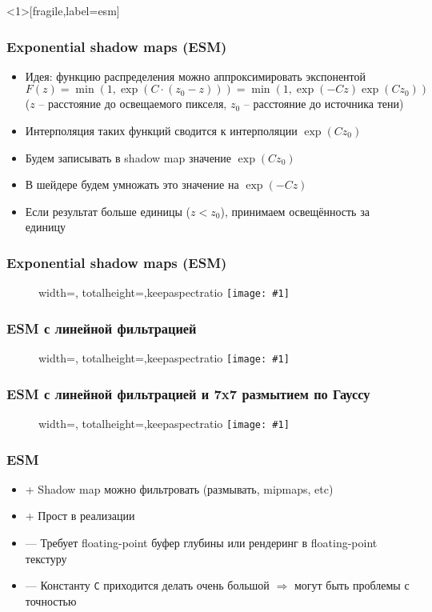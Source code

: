\documentclass{beamer}
\newcommand{\slideimage}[1]{
  \begin{figure}
    \begin{adjustbox}{width=\textwidth, totalheight=\textheight-2\baselineskip-2\baselineskip,keepaspectratio}
      \texttt{[image: \#1]}
    \end{adjustbox}
  \end{figure}
}
\begin{document}
\begin{frame}<1>[fragile,label=esm]
\frametitle{Exponential shadow maps (ESM)}
\begin{itemize}
\item Идея: функцию распределения можно аппроксимировать экспонентой \begin{math}F(z) = \min(1, \exp(C \cdot (z_0 - z))) = \min(1, \exp(-Cz)\exp(Cz_0))\end{math} (\begin{math}z\end{math} -- расстояние до освещаемого пикселя, \begin{math}z_0\end{math} -- расстояние до источника тени)
\pause
\item Интерполяция таких функций сводится к интерполяции \begin{math}\exp(Cz_0)\end{math}
\pause
\item Будем записывать в shadow map значение \begin{math}\exp(Cz_0)\end{math}
\pause
\item В шейдере будем умножать это значение на \begin{math}\exp(-Cz)\end{math}
\pause
\item Если результат больше единицы (\begin{math}z < z_0\end{math}), принимаем освещённость за единицу
\end{itemize}
\end{frame}

\begin{frame}[fragile]
\frametitle{Exponential shadow maps (ESM)}
\slideimage{exp_plot.png}
\end{frame}


\begin{frame}[fragile]
\frametitle{ESM с линейной фильтрацией}
\slideimage{exp.png}
\end{frame}

\begin{frame}[fragile]
\frametitle{ESM с линейной фильтрацией и 7x7 размытием по Гауссу}
\slideimage{exp_gauss.png}
\end{frame}

\begin{frame}[fragile]
\frametitle{ESM}
\begin{itemize}
\item {\color{green}+} Shadow map можно фильтровать (размывать, mipmaps, etc)
\item {\color{green}+} Прост в реализации
\item {\color{red}—} Требует floating-point буфер глубины или рендеринг в floating-point текстуру
\item {\color{red}—} Константу \verb|C| приходится делать очень большой \begin{math}\Rightarrow\end{math} могут быть проблемы с точностью
\end{itemize}
\end{frame}
\end{document}
